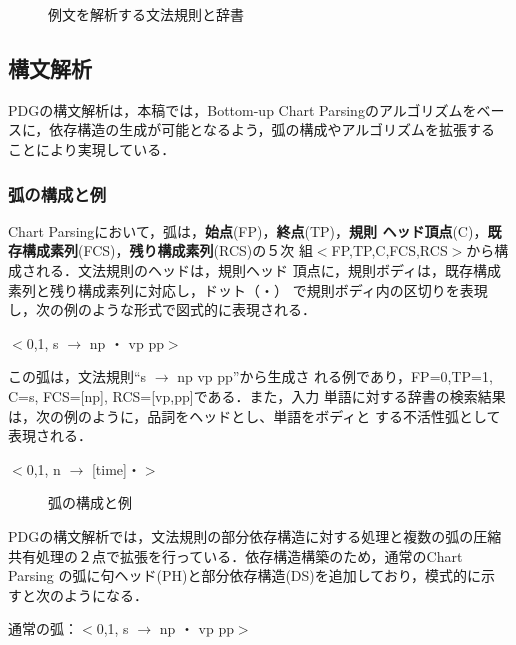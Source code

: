 \begin{figure}[t]
 \begin{center}
 \end{center}
\myfiglabelskip
\caption{例文を解析する文法規則と辞書}
\label{fig:ExampleGrammar}
\end{figure}

\subsection{構文解析}\label{sec:konokousei}

PDGの構文解析は，本稿では，Bottom-up Chart Parsingのアルゴリズムをベー
スに，依存構造の生成が可能となるよう，弧の構成やアルゴリズムを拡張する
ことにより実現している．

\subsubsection{弧の構成と例}

Chart Parsingにおいて，弧は，{\bf 始点}(FP)，{\bf 終点}(TP)，{\bf 規則
ヘッド頂点}(C)，{\bf 既存構成素列}(FCS)，{\bf 残り構成素列}(RCS)の５次
組$<$FP,TP,C,FCS,RCS$>$から構成される．文法規則のヘッドは，規則ヘッド
頂点に，規則ボディは，既存構成素列と残り構成素列に対応し，ドット（・）
で規則ボディ内の区切りを表現し，次の例のような形式で図式的に表現される．

 $<$0,1, s $\rightarrow$ np ・ vp pp$>$

{\mynoindent}この弧は，文法規則``s $\rightarrow$ np vp pp''から生成さ
れる例であり，FP=0,TP=1, C=s, FCS=[np], RCS=[vp,pp]である．また，入力
単語に対する辞書の検索結果は，次の例のように，品詞をヘッドとし、単語をボディと
する不活性弧として表現される．

 $<$0,1, n $\rightarrow$ [time]・$>$

\begin{figure}[b]
 \begin{center}
 \end{center}
\myfiglabelskip
\caption{弧の構成と例}
\label{fig:ArcStructure}
\end{figure}

PDGの構文解析では，文法規則の部分依存構造に対する処理と複数の弧の圧縮
共有処理の２点で拡張を行っている．依存構造構築のため，通常のChart
Parsing の弧に句ヘッド(PH)と部分依存構造(DS)を追加しており，模式的に示
すと次のようになる．

通常の弧：$<$0,1, s $\rightarrow$ np ・ vp pp$>$

